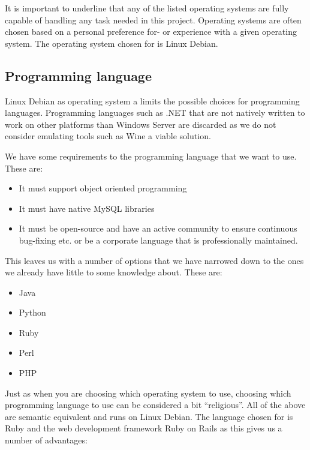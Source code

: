 It is important to underline that any of the listed operating systems are fully capable of handling any task needed in this project.
Operating systems are often chosen based on a personal preference for- or experience with a given operating system.
The operating system chosen for \projectname{} is Linux Debian.

\subsection{Programming language}
Linux Debian as operating system a limits the possible choices for programming languages. 
Programming languages such as .NET that are not natively written to work on other platforms than Windows Server are discarded as we do not consider emulating tools such as Wine a viable solution. 

We have some requirements to the programming language that we want to use.
These are:

\begin{itemize}
	\item It must support object oriented programming
	\item It must have native MySQL libraries
	\item It must be open-source and have an active community to ensure continuous bug-fixing etc. or be a corporate language that is professionally maintained.
\end{itemize} 

This leaves us with a number of options that we have narrowed down to the ones we already have little to some knowledge about. 
These are:
\begin{itemize}
	\item Java
	\item Python
	\item Ruby
	\item Perl
	\item PHP
\end{itemize}

Just as when you are choosing which operating system to use, choosing which programming language to use can be considered a bit ``religious''.
All of the above are semantic equivalent and runs on Linux Debian.
The language chosen for \projectname{} is Ruby and the web development framework Ruby on Rails as this gives us a number of advantages:

